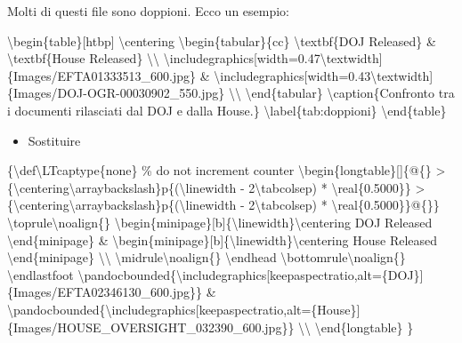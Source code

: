 \documentclass[
  italian,
  a4paper,
]{article}
\newenvironment{Shaded}{\begin{snugshade}}{\end{snugshade}}
\newcommand{\NormalTok}[1]{\textcolor[rgb]{0.00,0.23,0.31}{#1}}
\newcounter{none} %
\providecommand{\tightlist}{%
  \setlength{\itemsep}{0pt}\setlength{\parskip}{0pt}}
\begin{document}
\begin{Shaded}
\begin{Highlighting}[]
\NormalTok{Molti di questi file sono doppioni. Ecco un esempio:}

\NormalTok{\textbackslash{}begin\{table\}[htbp]}
\NormalTok{\textbackslash{}centering}
\NormalTok{\textbackslash{}begin\{tabular\}\{cc\}}
\NormalTok{\textbackslash{}textbf\{DOJ Released\} \& \textbackslash{}textbf\{House Released\} \textbackslash{}\textbackslash{}}
\NormalTok{\textbackslash{}includegraphics[width=0.47\textbackslash{}textwidth]\{Images/EFTA01333513\_600.jpg\} \& \textbackslash{}includegraphics[width=0.43\textbackslash{}textwidth]\{Images/DOJ{-}OGR{-}00030902\_550.jpg\} \textbackslash{}\textbackslash{}}
\NormalTok{\textbackslash{}end\{tabular\}}
\NormalTok{\textbackslash{}caption\{Confronto tra i documenti rilasciati dal DOJ e dalla House.\}}
\NormalTok{\textbackslash{}label\{tab:doppioni\}}
\NormalTok{\textbackslash{}end\{table\}}
\end{Highlighting}
\end{Shaded}

\normalsize

\begin{itemize}
\tightlist
\item
  Sostituire \scriptsize
\end{itemize}

\begin{Shaded}
\begin{Highlighting}[]
\NormalTok{\{\textbackslash{}def\textbackslash{}LTcaptype\{none\} \% do not increment counter}
\NormalTok{\textbackslash{}begin\{longtable\}[]\{@\{\}}
\NormalTok{  \textgreater{}\{\textbackslash{}centering\textbackslash{}arraybackslash\}p\{(\textbackslash{}linewidth {-} 2\textbackslash{}tabcolsep) * \textbackslash{}real\{0.5000\}\}}
\NormalTok{  \textgreater{}\{\textbackslash{}centering\textbackslash{}arraybackslash\}p\{(\textbackslash{}linewidth {-} 2\textbackslash{}tabcolsep) * \textbackslash{}real\{0.5000\}\}@\{\}\}}
\NormalTok{\textbackslash{}toprule\textbackslash{}noalign\{\}}
\NormalTok{\textbackslash{}begin\{minipage\}[b]\{\textbackslash{}linewidth\}\textbackslash{}centering}
\NormalTok{DOJ Released}
\NormalTok{\textbackslash{}end\{minipage\} \& \textbackslash{}begin\{minipage\}[b]\{\textbackslash{}linewidth\}\textbackslash{}centering}
\NormalTok{House Released}
\NormalTok{\textbackslash{}end\{minipage\} \textbackslash{}\textbackslash{}}
\NormalTok{\textbackslash{}midrule\textbackslash{}noalign\{\}}
\NormalTok{\textbackslash{}endhead}
\NormalTok{\textbackslash{}bottomrule\textbackslash{}noalign\{\}}
\NormalTok{\textbackslash{}endlastfoot}
\NormalTok{\textbackslash{}pandocbounded\{\textbackslash{}includegraphics[keepaspectratio,alt=\{DOJ\}]\{Images/EFTA02346130\_600.jpg\}\}}
\NormalTok{\&}
\NormalTok{\textbackslash{}pandocbounded\{\textbackslash{}includegraphics[keepaspectratio,alt=\{House\}]\{Images/HOUSE\_OVERSIGHT\_032390\_600.jpg\}\} \textbackslash{}\textbackslash{}}
\NormalTok{\textbackslash{}end\{longtable\}}
\NormalTok{\}}
\end{Highlighting}
\end{Shaded}
\end{document}
